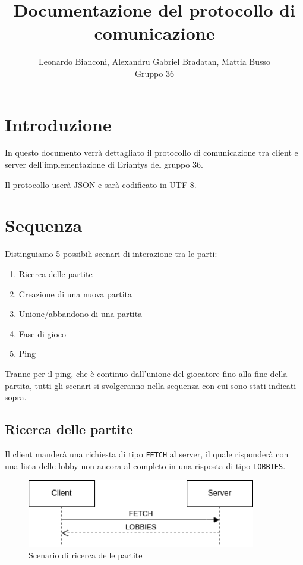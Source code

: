 \documentclass[a4paper,12pt]{article}
\title{Documentazione del protocollo di comunicazione}
\author{Leonardo Bianconi, Alexandru Gabriel Bradatan, Mattia Busso\\Gruppo 36}
\begin{document}
\maketitle
\tableofcontents

\section{Introduzione}

In questo documento verrà dettagliato il protocollo di comunicazione tra
client e server dell'implementazione di Eriantys del gruppo 36.

Il protocollo userà JSON e sarà codificato in UTF-8.

\section{Sequenza}

Distinguiamo 5 possibili scenari di interazione tra le parti:

\begin{enumerate}
\item Ricerca delle partite
\item Creazione di una nuova partita
\item Unione/abbandono di una partita
\item Fase di gioco
\item Ping
\end{enumerate}

Tranne per il ping, che è continuo dall'unione del giocatore fino alla fine
della partita, tutti gli scenari si svolgeranno nella sequenza con cui sono
stati indicati sopra.

\subsection{Ricerca delle partite}

Il client manderà una richiesta di tipo \texttt{FETCH} al server, il quale
risponderà con una lista delle lobby non ancora al completo in una risposta
di tipo \texttt{LOBBIES}.

\begin{figure}[htb]
  \centering
  \includegraphics[width=10cm]{fetch.png}
  \caption{Scenario di ricerca delle partite}%
  \label{fig:fetch}
\end{figure}
\end{document}

